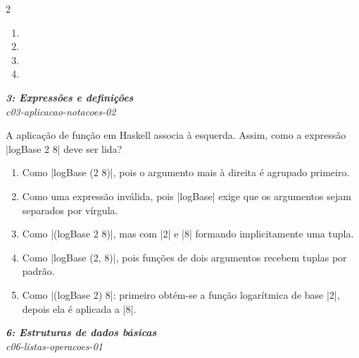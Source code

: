 \documentclass[a4paper,10pt,brazil]{article}
\begin{document}
\begin{multicols}{2}
\begin{enumerate}
  \item {}

  \item {}

  \item {}

  \item {}


\end{enumerate}

\begin{flushright}
  \footnotesize
  \textit{\textbf{3: Expressões e definições}}\\
  \textit{c03-aplicacao-notacoes-02}\\

\end{flushright}
A aplicação de função em Haskell associa à esquerda. Assim, como a expressão \haskellinline|logBase 2 8| deve ser lida?

\begin{enumerate}
  \item Como \haskellinline|logBase (2 8)|, pois o argumento mais à direita é agrupado primeiro.

  \item Como uma expressão inválida, pois \haskellinline|logBase| exige que os argumentos sejam separados por vírgula.

  \item Como \haskellinline|(logBase 2 8)|, mas com \haskellinline|2| e \haskellinline|8| formando implicitamente uma tupla.

  \item Como \haskellinline|logBase (2, 8)|, pois funções de dois argumentos recebem tuplas por padrão.

  \item Como \haskellinline|(logBase 2) 8|: primeiro obtém-se a função logarítmica de base \haskellinline|2|, depois ela é aplicada a \haskellinline|8|.


\end{enumerate}

\begin{flushright}
  \footnotesize
  \textit{\textbf{6: Estruturas de dados básicas}}\\
  \textit{c06-listas-operacoes-01}\\


\end{flushright}
\end{multicols}
\end{document}
